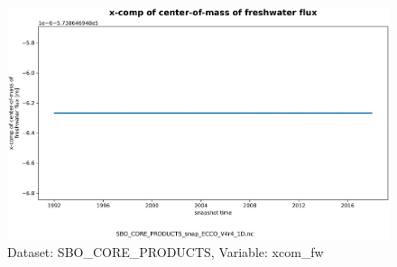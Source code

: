 \begin{figure}[H]
\centering
\includegraphics[scale=0.55]{../images/plots/v4r4/oneD_plots/SBO_Core_Products/xcom_fw.png}
\caption{Dataset: SBO\_CORE\_PRODUCTS, Variable: xcom\_fw}
\label{tab:table-SBO_CORE_PRODUCTS_xcom_fw-Plot}
\end{figure}
\newpage
\pagebreak
